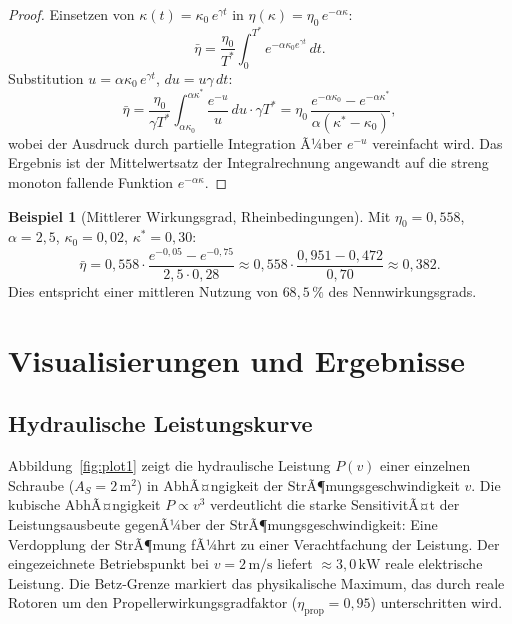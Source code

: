 ﻿\documentclass[a4paper,12pt]{article}
\theoremstyle{definition}
\newtheorem{beispiel}{Beispiel}
\begin{document}
\begin{proof}
Einsetzen von $\kappa(t) = \kappa_0\,e^{\gamma t}$ in $\eta(\kappa) = \eta_0\,e^{-\alpha\kappa}$:
\[
  \bar{\eta} = \frac{\eta_0}{T^*}\int_0^{T^*} e^{-\alpha\kappa_0 e^{\gamma t}}\,dt.
\]
Substitution $u = \alpha\kappa_0\,e^{\gamma t}$, $du = u\gamma\,dt$:
\[
  \bar{\eta} = \frac{\eta_0}{\gamma T^*}\int_{\alpha\kappa_0}^{\alpha\kappa^*}
               \frac{e^{-u}}{u}\,du \cdot \gamma T^*
             = \eta_0\,\frac{e^{-\alpha\kappa_0} - e^{-\alpha\kappa^*}}{\alpha(\kappa^* - \kappa_0)},
\]
wobei der Ausdruck durch partielle Integration Ã¼ber $e^{-u}$ vereinfacht wird.
Das Ergebnis ist der Mittelwertsatz der Integralrechnung angewandt auf die
streng monoton fallende Funktion $e^{-\alpha\kappa}$. \qedhere
\end{proof}

\begin{beispiel}[Mittlerer Wirkungsgrad, Rheinbedingungen]
Mit $\eta_0 = 0{,}558$, $\alpha = 2{,}5$, $\kappa_0 = 0{,}02$, $\kappa^* = 0{,}30$:
\[
  \bar{\eta} = 0{,}558 \cdot \frac{e^{-0{,}05} - e^{-0{,}75}}{2{,}5 \cdot 0{,}28}
             \approx 0{,}558 \cdot \frac{0{,}951 - 0{,}472}{0{,}70}
             \approx 0{,}382.
\]
Dies entspricht einer mittleren Nutzung von $68{,}5\,\%$ des Nennwirkungsgrads.
\end{beispiel}

\section{Visualisierungen und Ergebnisse}

\subsection{Hydraulische Leistungskurve}

Abbildung~\ref{fig:plot1} zeigt die hydraulische Leistung $P(v)$ einer einzelnen
Schraube ($A_S = 2\,\mathrm{m^2}$) in AbhÃ¤ngigkeit der StrÃ¶mungsgeschwindigkeit $v$.
Die kubische AbhÃ¤ngigkeit $P \propto v^3$ verdeutlicht die starke SensitivitÃ¤t der
Leistungsausbeute gegenÃ¼ber der StrÃ¶mungsgeschwindigkeit: Eine Verdopplung der
StrÃ¶mung fÃ¼hrt zu einer Verachtfachung der Leistung. Der eingezeichnete Betriebspunkt
bei $v = 2\,\mathrm{m/s}$ liefert $\approx 3{,}0\,\mathrm{kW}$ reale elektrische Leistung.
Die Betz-Grenze markiert das physikalische Maximum, das durch reale Rotoren um den
Propellerwirkungsgradfaktor ($\eta_{\mathrm{prop}} = 0{,}95$) unterschritten wird.
\end{document}
